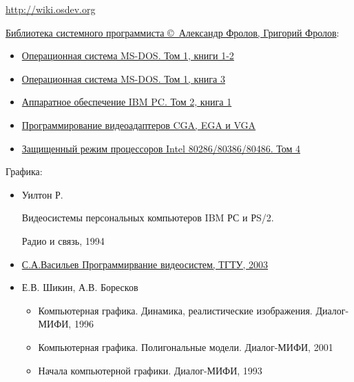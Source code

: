 \secdown


\url{http://wiki.osdev.org}

\bigskip

\href{http://www.frolov-lib.ru/bsp.html}{Библиотека системного программиста
\copyright\ Александр Фролов, Григорий Фролов}:

\begin{itemize}[nosep]
  \item \href{http://www.frolov-lib.ru/books/bsp/v01a/index.html}{Операционная
  система MS-DOS. Том 1, книги 1-2}
  \item \href{http://www.frolov-lib.ru/books/bsp/v01b/index.html}{Операционная
  система MS-DOS. Том 1, книга 3}
  \item \href{http://www.frolov-lib.ru/books/bsp/v02/index.html}{Аппаратное
  обеспечение IBM PC. Том 2, книга 1}
  \item \href{http://www.frolov-lib.ru/books/bsp/v03/index.html}{Программирование видеоадаптеров CGA, EGA и VGA}
  \item \href{http://www.frolov-lib.ru/books/bsp/v06/index.html}{Защищенный
  режим процессоров Intel 80286/80386/80486. Том 4}
\end{itemize}

\bigskip

Графика: \bigskip

\begin{itemize}[nosep]

\item 
Уилтон Р. 

Видеосистемы персональных компьютеров IBM РС и РS/2.

Радио и связь, 1994

\item

\href{http://ict.informika.ru/ft/004761/vasilev.pdf}{С.А.Васильев
Программирвание видеосистем, ТГТУ, 2003}

\item

Е.В. Шикин, А.В. Боресков

\begin{itemize}[nosep]
\item Компьютерная графика. Динамика, реалистические изображения.
Диалог-МИФИ, 1996
\item Компьютерная графика. Полигональные модели. Диалог-МИФИ, 2001
\item Начала компьютерной графики. Диалог-МИФИ, 1993
\end{itemize}

\end{itemize}

